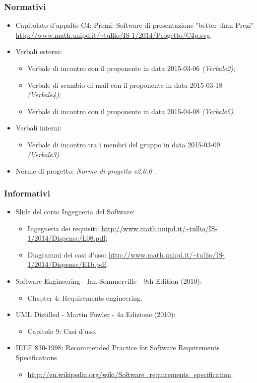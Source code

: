 \subsubsection{Normativi}
\begin{itemize}
	\item Capitolato d'appalto C4: Premi: Software di presentazione "better than Prezi"
	\newline \url{http://www.math.unipd.it/~tullio/IS-1/2014/Progetto/C4p.svg}.
	\item Verbali esterni:
	\begin{itemize}
		\item \gls{Verbale} di incontro con il proponente in data 2015-03-06 \textit{(Verbale2)};
		\item \gls{Verbale} di scambio di mail con il proponente in data 2015-03-18 \textit{(Verbale4)};
		\item \gls{Verbale} di incontro con il proponente in data 2015-04-08 \textit{(Verbale5)}.
	\end{itemize}
	\item Verbali interni:
	\begin{itemize}
		\item \gls{Verbale} di incontro tra i membri del gruppo in data 2015-03-09 \textit{(Verbale3)}.
	\end{itemize}
	\item Norme di progetto: \textit{Norme di progetto v2.0.0} .
\end{itemize}
\subsubsection{Informativi}
\begin{itemize}
	\item \gls{Slide} del corso Ingegneria del Software:
	\begin{itemize}
		\item Ingegneria dei requisiti: \url{http://www.math.unipd.it/~tullio/IS-1/2014/Dispense/L08.pdf};
		\item Diagrammi dei \gls{casi d'uso}: \url{http://www.math.unipd.it/~tullio/IS-1/2014/Dispense/E1b.pdf}.
	\end{itemize}
	\item Software Engineering - Ian Sommerville - 9th Edition (2010):
	\begin{itemize}
		\item Chapter 4: Requirements engineering.
	\end{itemize}
	\item \gls{UML} Distilled - Martin Fowler - 4a Edizione (2010):
	\begin{itemize}
		\item Capitolo 9: Casi d’uso.
	\end{itemize}
	\item IEEE 830-1998: Recommended Practice for Software Requirements Specifications
	\begin{itemize}
		\item \url{http://en.wikipedia.org/wiki/Software_requirements_specification}.
	\end{itemize}
\end{itemize}

